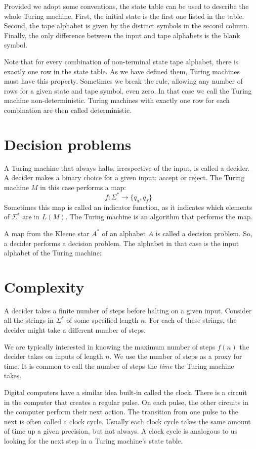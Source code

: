 \documentclass{iansnotes}
\begin{document}
  Provided we adopt some conventions, the state table can be used to describe the whole Turing machine.
  First, the initial state is the first one listed in the table.
  Second, the tape alphabet is given by the distinct symbols in the second column.
  Finally, the only difference between the input and tape alphabets is the blank symbol.
  
  Note that for every combination of non-terminal state tape alphabet, there is exactly one row in the state table.
  As we have defined them, Turing machines must have this property.
  Sometimes we break the rule, allowing any number of rows for a given state and tape symbol, even zero.
  In that case we call the Turing machine non-deterministic.
  Turing machines with exactly one row for each combination are then called deterministic.


\section{Decision problems}
  A Turing machine that always halts, irrespective of the input, is called a decider.  
  A decider makes a binary choice for a given input: accept or reject.
  The Turing machine $M$ in this case performs a map:
  \[ f:\Sigma^* \rightarrow \{ q_a, q_f \} \]
  Sometimes this map is called an indicator function, as it indicates which elements of $\Sigma^*$ are in $L(M)$.
  The Turing machine is an algorithm that performs the map.
  
  A map from the Kleene star $A^*$ of an alphabet $A$ is called a decision problem.
  So, a decider performs a decision problem.
  The alphabet in that case is the input alphabet of the Turing machine:


\section{Complexity}
  A decider takes a finite number of steps before halting on a given input.
  Consider all the strings in $\Sigma^*$ of some specified length $n$.
  For each of these strings, the decider might take a different number of steps.

  We are typically interested in knowing the maximum number of steps $f(n)$ the decider takes on inputs of length $n$.
  We use the number of steps as a proxy for time.
  It is common to call the number of steps the \emph{time} the Turing machine takes.

  Digital computers have a similar idea built-in called the clock.
  There is a circuit in the computer that creates a regular pulse.
  On each pulse, the other circuits in the computer perform their next action.
  The transition from one pulse to the next is often called a clock cycle.
  Usually each clock cycle takes the same amount of time up a given precision, but not always.
  A clock cycle is analogous to us looking for the next step in a Turing machine's state table.
  
\end{document}
